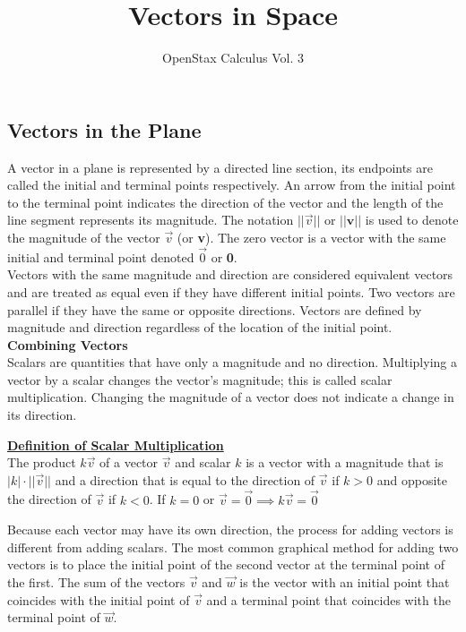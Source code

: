 \documentclass[a4paper]{article}
\title{Vectors in Space}
\author{OpenStax Calculus Vol. 3}
\date{}
\let\bf\textbf
\begin{document}
\setcounter{section}{2}
\maketitle

\subsection{Vectors in the Plane}
A vector in a plane is represented by a directed line section, its endpoints are called the initial and terminal points respectively. An arrow from the initial point to the terminal point indicates the direction of the vector and the length of the line segment represents its magnitude. The notation $||\vec{v}||$ or $||\bf{v}||$ is used to denote the magnitude of the vector $\vec{v}$ (or \bf{v}). The zero vector is a vector with the same initial and terminal point denoted $\vec{0}$ or \bf{0}. 
\vspace{1mm}\\
Vectors with the same magnitude and direction are considered equivalent vectors and are treated as equal even if they have different initial points. Two vectors are parallel if they have the same or opposite directions. Vectors are defined by magnitude and direction regardless of the location of the initial point.
\vspace{2mm}\\
\bf{Combining Vectors}\vspace{2mm}\\
Scalars are quantities that have only a magnitude and no direction. Multiplying a vector by a scalar changes the vector's magnitude; this is called scalar multiplication. Changing the magnitude of a vector does not indicate a change in its direction.
\begin{shaded}
    \noindent\underline{\bf{Definition of Scalar Multiplication}}\vspace{2mm}\\
    The product $k\vec{v}$ of a vector $\vec{v}$ and scalar $k$ is a vector with a magnitude that is $|k| \cdot ||\vec{v}||$ and a direction that is equal to the direction of $\vec{v}$ if $k>0$ and opposite the direction of $\vec{v}$ if $k<0$. If $k = 0$ or $\vec{v} = \vec{0} \implies k\vec{v} = \vec{0}$
\end{shaded}
\noindent Because each vector may have its own direction, the process for adding vectors is different from adding scalars. The most common graphical method for adding two vectors is to place the initial point of the second vector at the terminal point of the first. The sum of the vectors $\vec{v}$ and $\vec{w}$ is the vector with an initial point that coincides with the initial point of $\vec{v}$ and a terminal point that coincides with the terminal point of $\vec{w}$.
\end{document}
